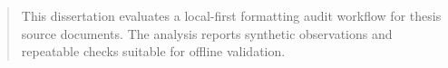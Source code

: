 \begin{abstract}
This dissertation evaluates a local-first formatting audit workflow for thesis
source documents. The analysis reports synthetic observations and repeatable
checks suitable for offline validation.
\end{abstract}
